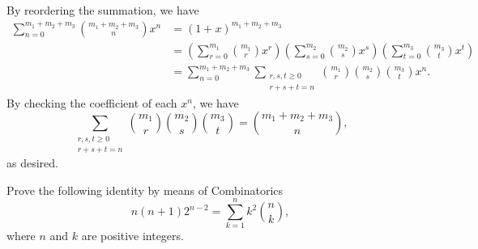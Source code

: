 \documentclass{assignment}[2019/10/15]
\newcommand{\lr}[3]{\left#1#3\right#2}
\begin{document}
    \begin{solution}
        By reordering the summation, we have
        \begin{equation}
            \begin{aligned}
                \sum_{n=0}^{m_1+m_2+m_3}\binom{m_1+m_2+m_3}{n}x^n
                &= (1+x)^{m_1+m_2+m_3}\\
                &= \lr(){\sum_{r=0}^{m_1}\binom{m_1}{r}x^r}\lr(){\sum_{s=0}^{m_2}\binom{m_2}{s}x^s}\lr(){\sum_{t=0}^{m_3}\binom{m_3}{t}x^t}\\
                &=\sum_{n=0}^{m_1+m_2+m_3}\sum_{\substack{r,s,t\geq 0\\ r+s+t=n}}\binom{m_1}{r} \binom {m_2}s \binom {m_3}t x^n.
            \end{aligned}
        \end{equation}
        By checking the coefficient of each $x^n$, we have
        \begin{equation}
            \sum_{\substack{r,s,t\geq 0\\ r+s+t=n}}\binom{m_1}{r} \binom {m_2}s \binom {m_3}t  = \binom{m_1+m_2+m_3}{n},
        \end{equation}
        as desired.
    \end{solution}
    \begin{problem}
        Prove the following identity by means of Combinatorics
        \begin{equation}
            n(n+1)2^{n-2}=\sum_{k=1}^nk^2\binom nk,
        \end{equation}
        where $n$ and $k$ are positive integers.
    \end{problem}
\end{document}
